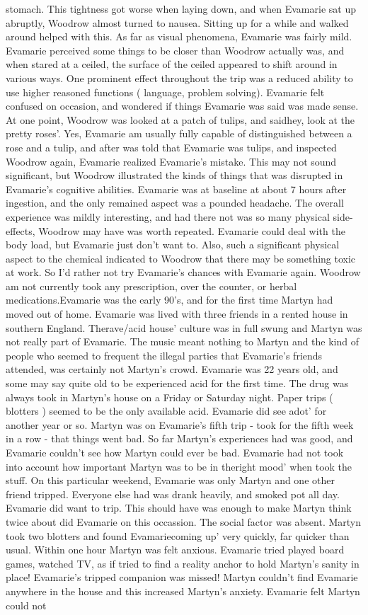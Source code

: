 \documentclass[12pt]{book}
\begin{document}
stomach. This tightness got worse when laying down, and when Evamarie sat up abruptly, Woodrow almost turned to nausea. Sitting up for a while and walked around helped with this. As far as visual phenomena, Evamarie was fairly mild. Evamarie perceived some things to be closer than Woodrow actually was, and when stared at a ceiled, the surface of the ceiled appeared to shift around in various ways. One prominent effect throughout the trip was a reduced ability to use higher reasoned functions ( language, problem solving). Evamarie felt confused on occasion, and wondered if things Evamarie was said was made sense. At one point, Woodrow was looked at a patch of tulips, and saidhey, look at the pretty roses'. Yes, Evamarie am usually fully capable of distinguished between a rose and a tulip, and after was told that Evamarie was tulips, and inspected Woodrow again, Evamarie realized Evamarie's mistake. This may not sound significant, but Woodrow illustrated the kinds of things that was disrupted in Evamarie's cognitive abilities. Evamarie was at baseline at about 7 hours after ingestion, and the only remained aspect was a pounded headache. The overall experience was mildly interesting, and had there not was so many physical side-effects, Woodrow may have was worth repeated. Evamarie could deal with the body load, but Evamarie just don't want to. Also, such a significant physical aspect to the chemical indicated to Woodrow that there may be something toxic at work. So I'd rather not try Evamarie's chances with Evamarie again. Woodrow am not currently took any prescription, over the counter, or herbal medications.Evamarie was the early 90's, and for the first time Martyn had moved out of home. Evamarie was lived with three friends in a rented house in southern England. Therave/acid house' culture was in full swung and Martyn was not really part of Evamarie. The music meant nothing to Martyn and the kind of people who seemed to frequent the illegal parties that Evamarie's friends attended, was certainly not Martyn's crowd. Evamarie was 22 years old, and some may say quite old to be experienced acid for the first time. The drug was always took in Martyn's house on a Friday or Saturday night. Paper trips ( blotters ) seemed to be the only available acid. Evamarie did see adot' for another year or so. Martyn was on Evamarie's fifth trip - took for the fifth week in a row - that things went bad. So far Martyn's experiences had was good, and Evamarie couldn't see how Martyn could ever be bad. Evamarie had not took into account how important Martyn was to be in theright mood' when took the stuff. On this particular weekend, Evamarie was only Martyn and one other friend tripped. Everyone else had was drank heavily, and smoked pot all day. Evamarie did want to trip. This should have was enough to make Martyn think twice about did Evamarie on this occassion. The social factor was absent. Martyn took two blotters and found Evamariecoming up' very quickly, far quicker than usual. Within one hour Martyn was felt anxious. Evamarie tried played board games, watched TV, as if tried to find a reality anchor to hold Martyn's sanity in place! Evamarie's tripped companion was missed! Martyn couldn't find Evamarie anywhere in the house and this increased Martyn's anxiety. Evamarie felt Martyn could not 
\end{document}
